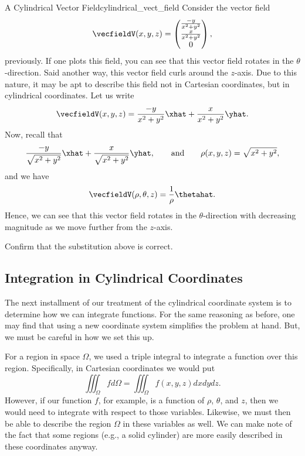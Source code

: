 \begin{ex}{A Cylindrical Vector Field}{cylindrical_vect_field}
    Consider the vector field
    \[
    \vecfieldV(x,y,z) = \begin{pmatrix} \frac{-y}{x^2+y^2} \\ \frac{x}{x^2+y^2} \\ 0 \end{pmatrix},
    \]
    previously.  If one plots this field, you can see that this vector field rotates in the $\theta$-direction. Said another way, this vector field curls around the $z$-axis.  Due to this nature, it may be apt to describe this field not in Cartesian coordinates, but in cylindrical coordinates.  Let us write
    \[
    \vecfieldV(x,y,z) = \frac{-y}{x^2+y^2}\xhat + \frac{x}{x^2+y^2}\yhat.
    \]
    Now, recall that
    \[
    \frac{-y}{\sqrt{x^2+y^2}}\xhat + \frac{x}{\sqrt{x^2+y^2}}\yhat, \qquad \textrm{and} \qquad \rho(x,y,z) = \sqrt{x^2+y^2},
    \]
    and we have
    \[
    \vecfieldV(\rho,\theta,z) = \frac{1}{\rho} \thetahat.
    \]
    Hence, we can see that this vector field rotates in the $\theta$-direction with decreasing magnitude as we move further from the $z$-axis.
\end{ex}

\begin{exercise}
    Confirm that the substitution above is correct.
\end{exercise}

\subsection{Integration in Cylindrical Coordinates}

The next installment of our treatment of the cylindrical coordinate system is to determine how we can integrate functions.  For the same reasoning as before, one may find that using a new coordinate system simplifies the problem at hand.  But, we must be careful in how we set this up.

For a region in space $\Omega$, we used a triple integral to integrate a function over this region.  Specifically, in Cartesian coordinates we would put
\[
\iiint_\Omega f d\Omega = \iiint_\Omega f(x,y,z) dxdydz.
\]
However, if our function $f$, for example, is a function of $\rho$, $\theta$, and $z$, then we would need to integrate with respect to those variables.  Likewise, we must then be able to describe the region $\Omega$ in these variables as well.  We can make note of the fact that some regions (e.g., a solid cylinder) are more easily described in these coordinates anyway.

